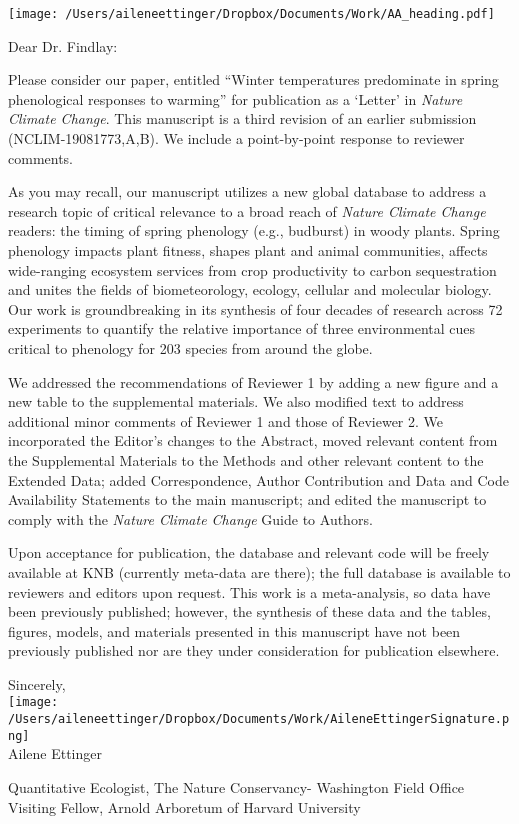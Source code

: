 \documentclass[11.5pt,a4paper]{letter}
\begin{document}
\begin{letter}{}
\texttt{[image: /Users/aileneettinger/Dropbox/Documents/Work/AA\_heading.pdf]}

\opening{Dear Dr. Findlay:}
Please consider our paper, entitled ``Winter temperatures predominate in spring phenological responses to warming'' for publication as a `Letter' in \emph{Nature Climate Change}. This manuscript is a third revision of an earlier submission (NCLIM-19081773,A,B). We include a point-by-point response to reviewer comments. 

\par As you may recall, our manuscript utilizes a new global database to address a research topic of critical relevance to a broad reach of \emph{Nature Climate Change} readers:  the timing of spring phenology (e.g., budburst) in woody plants. Spring phenology impacts plant fitness, shapes plant and animal communities, affects wide-ranging ecosystem services from crop productivity to carbon sequestration and unites the fields of biometeorology, ecology, cellular and molecular biology. Our work is groundbreaking in its synthesis of four decades of research across 72 experiments to quantify the relative importance of three environmental cues critical to phenology for 203 species from around the globe. 

\par We addressed the recommendations of Reviewer 1 by adding a new figure and a new table to the supplemental materials. We also modified text to address additional minor comments of Reviewer 1 and those of Reviewer 2. We incorporated the Editor's changes to the Abstract, moved relevant content from the Supplemental Materials to the Methods and other relevant content to the Extended Data; added Correspondence, Author Contribution and Data and Code Availability Statements to the main manuscript; and edited the manuscript to comply with the \emph{Nature Climate Change} Guide to Authors.

\par Upon acceptance for publication, the database and relevant code will be freely available at KNB (currently meta-data are there); the full database is available to reviewers and editors upon request. This work is a meta-analysis, so data have been previously published; however, the synthesis of these data and the tables, figures, models, and materials presented in this manuscript have not been previously published nor are they under consideration for publication elsewhere.

Sincerely,\\

\texttt{[image: /Users/aileneettinger/Dropbox/Documents/Work/AileneEttingerSignature.png]} \\
Ailene Ettinger\\
\begin{footnotesize}
Quantitative Ecologist, The Nature Conservancy- Washington Field Office\\
Visiting Fellow, Arnold Arboretum of Harvard University 
\end{footnotesize}

\end{letter}
\end{document}
